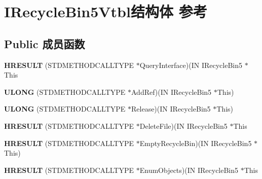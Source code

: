 \hypertarget{struct_i_recycle_bin5_vtbl}{}\section{I\+Recycle\+Bin5\+Vtbl结构体 参考}
\label{struct_i_recycle_bin5_vtbl}
\subsection*{Public 成员函数}
\begin{DoxyCompactItemize}
\item 
\mbox{\label{struct_i_recycle_bin5_vtbl_a7a2f0ed0ce8feaf12d33bb3dd3e1f24f}} 
{\bfseries H\+R\+E\+S\+U\+LT} (S\+T\+D\+M\+E\+T\+H\+O\+D\+C\+A\+L\+L\+T\+Y\+PE $\ast$Query\+Interface)(IN I\+Recycle\+Bin5 $\ast$This
\item 
\mbox{\label{struct_i_recycle_bin5_vtbl_aa5d316238abb00ce7d973713bde6e5b8}} 
{\bfseries U\+L\+O\+NG} (S\+T\+D\+M\+E\+T\+H\+O\+D\+C\+A\+L\+L\+T\+Y\+PE $\ast$Add\+Ref)(IN I\+Recycle\+Bin5 $\ast$This)
\item 
\mbox{\label{struct_i_recycle_bin5_vtbl_a61b8376652d9720593507647066c44e7}} 
{\bfseries U\+L\+O\+NG} (S\+T\+D\+M\+E\+T\+H\+O\+D\+C\+A\+L\+L\+T\+Y\+PE $\ast$Release)(IN I\+Recycle\+Bin5 $\ast$This)
\item 
\mbox{\label{struct_i_recycle_bin5_vtbl_a803b792fa90438b09e7dea062e9392c8}} 
{\bfseries H\+R\+E\+S\+U\+LT} (S\+T\+D\+M\+E\+T\+H\+O\+D\+C\+A\+L\+L\+T\+Y\+PE $\ast$Delete\+File)(IN I\+Recycle\+Bin5 $\ast$This
\item 
\mbox{\label{struct_i_recycle_bin5_vtbl_af18a2c3b83a0709c8ddebaaaa090bc63}} 
{\bfseries H\+R\+E\+S\+U\+LT} (S\+T\+D\+M\+E\+T\+H\+O\+D\+C\+A\+L\+L\+T\+Y\+PE $\ast$Empty\+Recycle\+Bin)(IN I\+Recycle\+Bin5 $\ast$This)
\item 
\mbox{\label{struct_i_recycle_bin5_vtbl_ac957fa8565b2ca1461dc7b1938a13aba}} 
{\bfseries H\+R\+E\+S\+U\+LT} (S\+T\+D\+M\+E\+T\+H\+O\+D\+C\+A\+L\+L\+T\+Y\+PE $\ast$Enum\+Objects)(IN I\+Recycle\+Bin5 $\ast$This
\item 

\end{DoxyCompactItemize}
